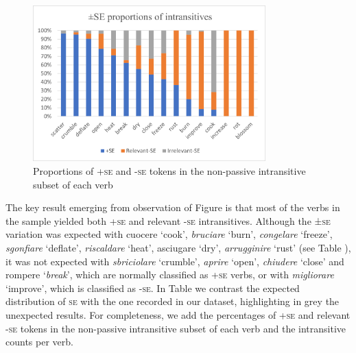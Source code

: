 \documentclass[output=paper,colorlinks,citecolor=brown
]{langscibook}
\begin{document}
\begin{figure}[hbt!]
\centering
\includegraphics[width=0.8\textwidth]{bentley_figure1.png}
\caption{\label{fig:bentley_figure_1}Proportions of +\textsc{se} and -\textsc{se} tokens in the non-passive intransitive subset of each verb}
\end{figure}    

The key result emerging from observation of Figure  is that most of the verbs in the sample yielded both +\textsc{se} and relevant -\textsc{se} intransitives. Although the ±\textsc{se} variation was expected with cuocere ‘cook’, \textit{bruciare} ‘burn’, \textit{congelare} ‘freeze’, \textit{sgonfiare} ‘deflate’, \textit{riscaldare} ‘heat’, asciugare ‘dry’, \textit{arrugginire} ‘rust’ (see Table ), it was not expected with \textit{sbriciolare} ‘crumble’, \textit{aprire} ‘open’, \textit{chiudere} ‘close’ and rompere ‘\textit{break}’, which are normally classified as +\textsc{se} verbs, or with \textit{migliorare} ‘improve’, which is classified as -\textsc{se}. In Table  we contrast the expected distribution of \textsc{se} with the one recorded in our dataset, highlighting in grey the unexpected results. For completeness, we add the percentages of +\textsc{se} and relevant -\textsc{se} tokens in the non-passive intransitive subset of each verb and the intransitive counts per verb.
\end{document}
